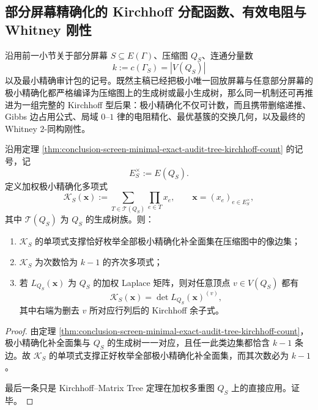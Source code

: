 \subsection{部分屏幕精确化的 Kirchhoff 分配函数、有效电阻与 Whitney 刚性}\label{subsec:conclusion-screen-kirchhoff-gibbs-whitney-rigidity}
沿用前一小节关于部分屏幕 \(S\subseteq E(\Gamma)\)、压缩图 \(Q_S\)、连通分量数
\[
k:=c(\Gamma_S)=|V(Q_S)|
\]
以及最小精确审计包的记号。既然主稿已经把极小唯一回放屏幕与任意部分屏幕的极小精确化都严格编译为压缩图上的生成树或最小生成树，那么同一机制还可再推进为一组完整的 Kirchhoff 型后果：极小精确化不仅可计数，而且携带删缩递推、Gibbs 边占用公式、局域 \(0\text{--}1\) 律的电阻精化、最优基簇的交换几何，以及最终的 Whitney \(2\)-同构刚性。

\begin{theorem}\label{thm:conclusion-screen-kirchhoff-partition-function}
沿用定理 \ref{thm:conclusion-screen-minimal-exact-audit-tree-kirchhoff-count} 的记号，记
\[
E_S^\times:=E(Q_S).
\]
定义加权极小精确化多项式
\[
\mathcal K_S(\mathbf x)
:=
\sum_{T\in\mathcal T(Q_S)}
\prod_{e\in T}x_e,
\qquad
\mathbf x=(x_e)_{e\in E_S^\times},
\]
其中 \(\mathcal T(Q_S)\) 为 \(Q_S\) 的生成树族。则：
\begin{enumerate}
  \item \(\mathcal K_S\) 的单项式支撑恰好枚举全部极小精确化补全面集在压缩图中的像边集；
  \item \(\mathcal K_S\) 为次数恰为 \(k-1\) 的齐次多项式；
  \item 若 \(L_{Q_S}(\mathbf x)\) 为 \(Q_S\) 的加权 Laplace 矩阵，则对任意顶点 \(v\in V(Q_S)\) 都有
  \[
  \mathcal K_S(\mathbf x)=\det L_{Q_S}(\mathbf x)^{(v)},
  \]
  其中右端为删去 \(v\) 所对应行列后的 Kirchhoff 余子式。
\end{enumerate}
\end{theorem}
\begin{proof}
由定理 \ref{thm:conclusion-screen-minimal-exact-audit-tree-kirchhoff-count}，极小精确化补全面集与 \(Q_S\) 的生成树一一对应，且任一此类边集都恰含 \(k-1\) 条边。故 \(\mathcal K_S\) 的单项式支撑正好枚举全部极小精确化补全面集，而其次数必为 \(k-1\)。

最后一条只是 Kirchhoff--Matrix Tree 定理在加权多重图 \(Q_S\) 上的直接应用。证毕。
\end{proof}

